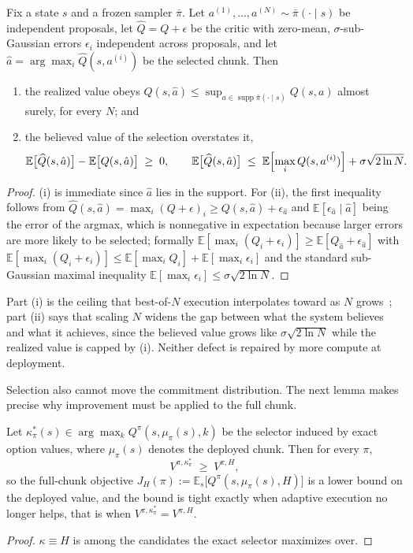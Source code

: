 \begin{proposition}
\label{prop:selection}
Fix a state $s$ and a frozen sampler $\bar\pi$. Let $a^{(1)},\dots,a^{(N)}\sim\bar\pi(\cdot\mid s)$
be independent proposals, let $\widehat Q=Q+\epsilon$ be the critic with zero-mean,
$\sigma$-sub-Gaussian errors $\epsilon_i$ independent across proposals, and let
$\hat a=\arg\max_i\widehat Q(s,a^{(i)})$ be the selected chunk. Then
\begin{enumerate}
\item[(i)] the realized value obeys
$Q(s,\hat a)\le\sup_{a\in\operatorname{supp}\bar\pi(\cdot\mid s)}Q(s,a)$ almost surely, for every
$N$; and
\item[(ii)] the believed value of the selection overstates it,
\[
\mathbb E\bigl[\widehat Q(s,\hat a)\bigr]-\mathbb E\bigl[Q(s,\hat a)\bigr]
\;\ge\;0,
\qquad
\mathbb E\bigl[\widehat Q(s,\hat a)\bigr]
\;\le\;
\mathbb E\Bigl[\max_i Q(s,a^{(i)})\Bigr]+\sigma\sqrt{2\ln N}.
\]
\end{enumerate}
\end{proposition}
\begin{proof}
(i) is immediate since $\hat a$ lies in the support. For (ii), the first inequality follows from
$\widehat Q(s,\hat a)=\max_i(Q+\epsilon)_i\ge Q(s,\hat a)+\epsilon_{\hat a}$ and
$\mathbb E[\epsilon_{\hat a}\mid\hat a]$ being the error of the argmax, which is nonnegative in
expectation because larger errors are more likely to be selected; formally
$\mathbb E[\max_i(Q_i+\epsilon_i)]\ge\mathbb E[Q_{\hat a}+\epsilon_{\hat a}]$ with
$\mathbb E[\max_i(Q_i+\epsilon_i)]\le\mathbb E[\max_iQ_i]+\mathbb E[\max_i\epsilon_i]$ and the
standard sub-Gaussian maximal inequality $\mathbb E[\max_i\epsilon_i]\le\sigma\sqrt{2\ln N}$.
\end{proof}

Part (i) is the ceiling that best-of-$N$ execution interpolates toward as $N$ grows~\citep{emaq};
part (ii) says that scaling $N$ widens the gap between what the system believes and what it
achieves, since the believed value grows like $\sigma\sqrt{2\ln N}$ while the realized value is
capped by (i). Neither defect is repaired by more compute at deployment.

Selection also cannot move the commitment distribution. The next lemma makes precise why
improvement must be applied to the full chunk.

\begin{lemma}
\label{lem:fullchunk}
Let $\kappa^{*}_{\pi}(s)\in\arg\max_{k}Q^{\pi}(s,\mu_\pi(s),k)$ be the selector induced by exact
option values, where $\mu_\pi(s)$ denotes the deployed chunk. Then for every $\pi$,
\[
V^{\pi,\kappa^{*}_{\pi}}\;\ge\;V^{\pi,H},
\]
so the full-chunk objective $J_H(\pi):=\mathbb E_{s}\bigl[Q^{\pi}(s,\mu_\pi(s),H)\bigr]$ is a lower
bound on the deployed value, and the bound is tight exactly when adaptive execution no longer
helps, that is when $V^{\pi,\kappa^{*}_{\pi}}=V^{\pi,H}$.
\end{lemma}
\begin{proof}
$\kappa\equiv H$ is among the candidates the exact selector maximizes over.
\end{proof}

